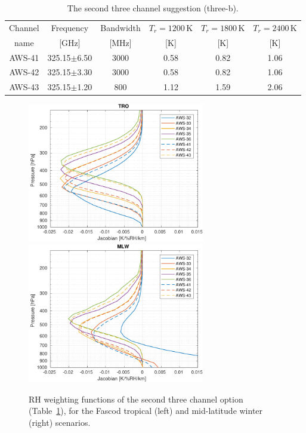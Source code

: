 \documentclass[12pt]{article}
\begin{document}
\begin{table}[!p]
  \centering  
  \begin{tabular}[c]{c|c|c|ccc}
    Channel & Frequency   & Bandwidth & $T_r=1200$\,K
    & $T_r=1800$\,K & $T_r=2400$\,K\\
    name    & [GHz] &  [MHz] & [K]  & [K] & [K]\\
    \hline
    AWS-41  & 325.15$\pm$6.50 & 3000  & 0.58 & 0.82 & 1.06\\
    AWS-42  & 325.15$\pm$3.30 & 3000  & 0.58 & 0.82 & 1.06\\
    AWS-43  & 325.15$\pm$1.20 & \phantom{0}800 & 1.12 & 1.59 & 2.06\\
    \hline
  \end{tabular}
  \caption{The second three channel suggestion (three-b).}
  \label{tab:chs:3b}
\end{table}


\begin{figure}[!p]
  \centering
  \includegraphics[height=61mm]{fascod_3bchopt_tro}\hspace{5mm}%
  \includegraphics[clip,trim=43 0 0 0,height=61mm]{fascod_3bchopt_mlw}
  \caption{RH weighting functions of the second three channel option
    (Table~\ref{tab:chs:3b}), for the Fascod tropical (left) and mid-latitude
    winter (right) scenarios.}
  \label{fig:3bch:prel}
\end{figure}
\end{document}

